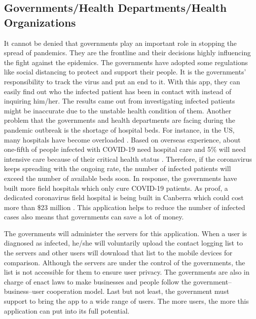   \subsection{Governments/Health Departments/Health Organizations}
    \par It cannot be denied that governments play an important role in stopping the spread of pandemics. They are the frontline and their decisions highly influencing the fight against the epidemics. The governments have adopted some regulations like social distancing to protect and support their people. It is the governments’ responsibility to track the virus and put an end to it. With this app, they can easily find out who the infected patient has been in contact with instead of inquiring him/her.  The results came out from investigating infected patients might be inaccurate due to the unstable health condition of them. Another problem that the governments and health departments are facing during the pandemic outbreak is the shortage of hospital beds.  For instance,  in the  US,  many hospitals have become overloaded \cite{Stake6}.  Based on overseas experience,  about one-fifth of people infected with COVID-19 need hospital care and 5\% will need intensive care because of their critical health status \cite{Stake3}.  Therefore,  if the coronavirus keeps spreading with the ongoing rate, the number of infected patients will exceed the number of available beds soon. In response, the governments have built more field hospitals which only cure COVID-19 patients. As proof, a dedicated coronavirus field hospital is being built in Canberra which could cost more than \$23 million \cite{Stake7}. This application helps to reduce the number of infected cases also means that governments can save a lot of money.

    \par The governments will administer the servers for this application. When a user is diagnosed as infected, he/she will voluntarily upload the contact logging list to the servers and other users will download that list to the mobile devices for comparison. Although the servers are under the control of the governments, the list is not accessible for them to ensure user privacy. The governments are also in charge of enact laws to make businesses and people follow the government–business–user cooperation model. Last but not least, the government must support to bring the app to a wide range of users. The more users, the more this application can put into its full potential.

